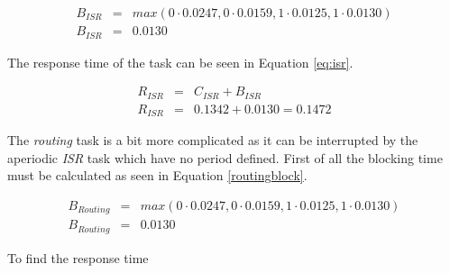 \begin{eqnarray}
\label{eq:isrblock}
     B_{ISR} &=& max(0 \cdot 0.0247, 0 \cdot 0.0159, 1 \cdot 0.0125, 1 \cdot 0.0130) \nonumber \\
     B_{ISR} &=& 0.0130
\end{eqnarray}

The response time of the task can be seen in Equation \ref{eq:isr}.

\begin{eqnarray}
\label{eq:isr}
      R_{ISR} &=& C_{ISR} + B_{ISR} \nonumber \\
      R_{ISR} &=& 0.1342 + 0.0130 = 0.1472
\end{eqnarray}

The \textit{routing} task is a bit more complicated as it can be interrupted by the aperiodic \textit{ISR} task which have no period defined. First of all the blocking time must be calculated as seen in Equation \ref{routingblock}.

\begin{eqnarray}
\label{eq:routingblock}
     B_{Routing} &=& max(0 \cdot 0.0247, 0 \cdot 0.0159, 1 \cdot 0.0125, 1 \cdot 0.0130) \nonumber \\
     B_{Routing} &=& 0.0130
\end{eqnarray}

To find the response time




